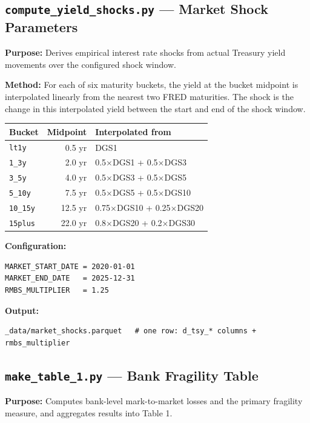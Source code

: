 \documentclass[12pt, a4paper]{article}
\begin{document}
\subsection{\texttt{compute\_yield\_shocks.py} --- Market Shock Parameters}

\textbf{Purpose:} Derives empirical interest rate shocks from actual Treasury
yield movements over the configured shock window.

\textbf{Method:} For each of six maturity buckets, the yield at the bucket
midpoint is interpolated linearly from the nearest two FRED maturities.
The shock is the change in this interpolated yield between the start and end
of the shock window.

\begin{center}
\begin{tabular}{lrp{5.5cm}}
\toprule
Bucket & Midpoint & Interpolated from \\
\midrule
\texttt{lt1y}    & 0.5 yr  & DGS1 \\
\texttt{1\_3y}   & 2.0 yr  & 0.5$\times$DGS1 + 0.5$\times$DGS3 \\
\texttt{3\_5y}   & 4.0 yr  & 0.5$\times$DGS3 + 0.5$\times$DGS5 \\
\texttt{5\_10y}  & 7.5 yr  & 0.5$\times$DGS5 + 0.5$\times$DGS10 \\
\texttt{10\_15y} & 12.5 yr & 0.75$\times$DGS10 + 0.25$\times$DGS20 \\
\texttt{15plus}  & 22.0 yr & 0.8$\times$DGS20 + 0.2$\times$DGS30 \\
\bottomrule
\end{tabular}
\end{center}

\textbf{Configuration:}
\begin{lstlisting}
MARKET_START_DATE = 2020-01-01
MARKET_END_DATE   = 2025-12-31
RMBS_MULTIPLIER   = 1.25
\end{lstlisting}

\textbf{Output:}
\begin{lstlisting}
_data/market_shocks.parquet   # one row: d_tsy_* columns + rmbs_multiplier
\end{lstlisting}

\subsection{\texttt{make\_table\_1.py} --- Bank Fragility Table}

\textbf{Purpose:} Computes bank-level mark-to-market losses and the primary
fragility measure, and aggregates results into Table 1.
\end{document}
